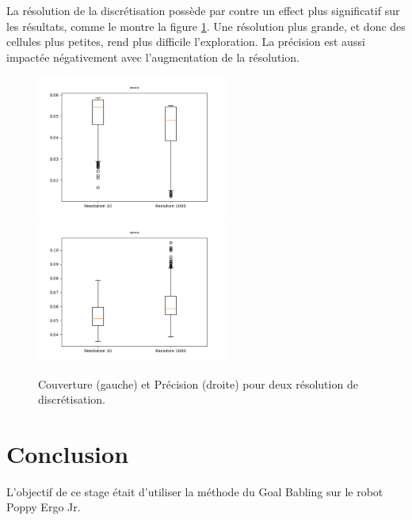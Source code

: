 \documentclass[11pt,french]{report}
\begin{document}
La résolution de la discrétisation possède par contre un effect plus significatif sur les résultats, comme le montre la figure \ref{fig:effet_res}.
Une résolution plus grande, et donc des cellules plus petites, rend plus difficile l'exploration. La précision est aussi impactée négativement avec l'augmentation de la résolution.

\begin{figure}[h]
    \centering
    \includegraphics[width=178pt]{Fro_10-1kres_couver.png} \includegraphics[width=178pt]{Fro_10-1kres_moy_gl.png}
    \caption{Couverture (gauche) et Précision (droite) pour deux résolution de discrétisation.}
    \label{fig:effet_res}
\end{figure}

\chapter{Conclusion}

L'objectif de ce stage était d'utiliser la méthode du Goal Babling sur le robot Poppy Ergo Jr.




\end{document}
